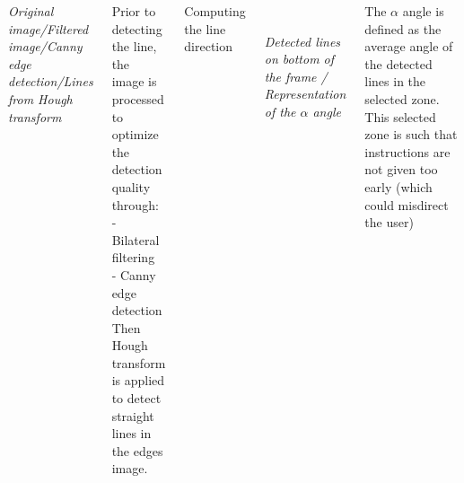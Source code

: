 \documentclass[17pt, a1paper, portrait]{tikzposter}
\begin{document}
\begin{columns}
{\begin{center}
\caption{\emph{Original image/Filtered image/Canny edge detection/Lines from Hough transform}}
\end{center}

Prior to detecting the line, the image is processed to optimize the detection quality through: \\
- Bilateral filtering \\
- Canny edge detection \\
Then Hough transform is applied to detect straight lines in the edges image.
 

\vspace{2mm}

\begin{center} \LARGE {Computing the line direction}
\end{center}

\begin{center}
\\
\centering
\caption{\emph{Detected lines on bottom of the frame / Representation of the \(\alpha\) angle}}
\end{center}
The \(\alpha\) angle is defined as the average angle of the detected lines in the selected zone.
This selected zone is such that instructions are not given too early (which could misdirect the user)



}
\end{columns}
\end{document}
